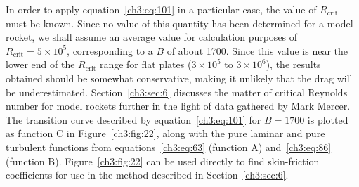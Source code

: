 In order to apply equation~\eqref{ch3:eq:101} in a particular case,
the value of $R_{\mathrm{crit}}$ must be known. Since no value of this
quantity has been determined for a model rocket, we shall
assume an average value for calculation purposes of $R_{\mathrm{crit}} = 5 \times 10^{5}$,
corresponding to a $B$ of about 1700. Since this value is near
the lower end of the $R_{\mathrm{crit}}$ range for flat plates ($3 \times 10^{5}$ to
$3 \times 10^{6}$), the results obtained should be somewhat conservative,
making it unlikely that the drag will be underestimated. Section~\ref{ch3:sec:6}
discusses the matter of critical Reynolds number for model
rockets further in the light of data gathered by Mark Mercer.
The transition curve described by equation~\eqref{ch3:eq:101} for $B = 1700$
is plotted as function C in Figure~\ref{ch3:fig:22}, along with the pure laminar
and pure turbulent functions from equations~\eqref{ch3:eq:63} (function A)
and~\eqref{ch3:eq:86} (function B). Figure~\ref{ch3:fig:22} can be used directly to find
skin-friction coefficients for use in the method described
in Section~\ref{ch3:sec:6}.
